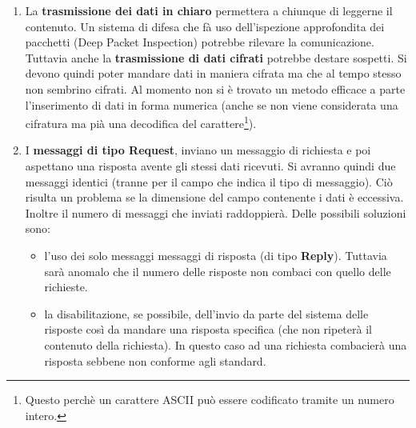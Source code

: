 \begin{enumerate}
    \item La \textbf{trasmissione dei dati in chiaro} permettera a chiunque di leggerne il contenuto. 
    Un sistema di difesa che fà uso dell'ispezione approfondita dei pacchetti (Deep Packet Inspection) potrebbe rilevare la comunicazione. 
    Tuttavia anche la \textbf{trasmissione di dati cifrati} potrebbe destare sospetti. 
    \vspace{1ex} \newline 
    Si devono quindi poter mandare dati in maniera cifrata ma che al tempo stesso non sembrino cifrati.  
    Al momento non si è trovato un metodo efficace a parte l'inserimento di dati in forma numerica 
    (anche se non viene considerata una cifratura ma pià una decodifica del carattere\footnote{Questo perchè un carattere ASCII può essere codificato tramite un numero intero.}). 
    \item I \textbf{messaggi di tipo Request}, inviano un messaggio di richiesta e poi aspettano una risposta 
    avente gli stessi dati ricevuti. 
    Si avranno quindi due messaggi identici (tranne per il campo che indica il tipo di messaggio). 
    Ciò risulta un problema se la dimensione del campo contenente i dati è eccessiva. 
    Inoltre il numero di messaggi che inviati raddoppierà.    
    \vspace{1ex} \newline 
    Delle possibili soluzioni sono: 
    \begin{itemize} 
        \item l'uso dei solo messaggi messaggi di risposta (di tipo \textbf{Reply}). 
        Tuttavia sarà anomalo che il numero delle risposte non combaci con 
        quello delle richieste. 
        \item la disabilitazione, se possibile, dell'invio da parte del sistema delle risposte 
        così da mandare una risposta specifica (che non ripeterà il contenuto della richiesta). 
        In questo caso ad una richiesta combacierà una risposta sebbene 
        non conforme agli standard. 
    \end{itemize}
\end{enumerate} 

